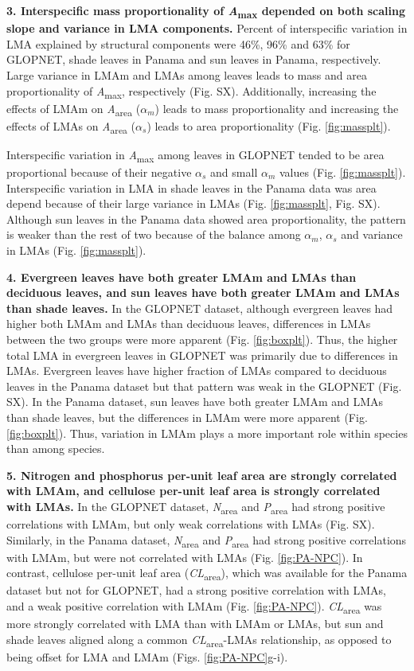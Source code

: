 \documentclass[
  12pt,
]{article}
\begin{document}
\textbf{3. Interspecific mass proportionality of \emph{A}\textsubscript{max} depended on both scaling slope and variance in LMA components.}
Percent of interspecific variation in LMA explained by structural components were 46\%, 96\% and 63\% for GLOPNET, shade leaves in Panama and sun leaves in Panama, respectively.
Large variance in LMAm and LMAs among leaves leads to mass and area proportionality of \emph{A}\textsubscript{max}, respectively (Fig. SX). Additionally, increasing the effects of LMAm on \emph{A}\textsubscript{area} (\(\alpha_m\)) leads to mass proportionality and increasing the effects of LMAs on \emph{A}\textsubscript{area} (\(\alpha_s\)) leads to area proportionality (Fig. \ref{fig:massplt}).

Interspecific variation in \emph{A}\textsubscript{max} among leaves in GLOPNET tended to be area proportional because of their negative \(\alpha_s\) and small \(\alpha_m\) values (Fig. \ref{fig:massplt}).
Interspecific variation in LMA in shade leaves in the Panama data was area depend because of their large variance in LMAs (Fig. \ref{fig:massplt}, Fig. SX).
Although sun leaves in the Panama data showed area proportionality, the
pattern is weaker than the rest of two because of the balance among \(\alpha_m\), \(\alpha_s\) and variance in LMAs (Fig. \ref{fig:massplt}).

\textbf{4. Evergreen leaves have both greater LMAm and LMAs than deciduous leaves, and sun leaves have both greater LMAm and LMAs than shade leaves.}
In the GLOPNET dataset, although evergreen leaves had higher both LMAm and LMAs than deciduous leaves, differences in LMAs between the two groups were more apparent (Fig. \ref{fig:boxplt}).
Thus, the higher total LMA in evergreen leaves in GLOPNET was primarily due to differences in LMAs.
Evergreen leaves have higher fraction of LMAs compared to deciduous leaves in the Panama dataset but that pattern was weak in the GLOPNET (Fig. SX).
In the Panama dataset, sun leaves have both greater LMAm and LMAs than shade leaves, but the differences in LMAm were more apparent (Fig. \ref{fig:boxplt}).
Thus, variation in LMAm plays a more important role within species than among species.

\textbf{5. Nitrogen and phosphorus per-unit leaf area are strongly correlated with LMAm, and cellulose per-unit leaf area is strongly correlated with LMAs.}
In the GLOPNET dataset, \emph{N}\textsubscript{area} and \emph{P}\textsubscript{area} had strong positive correlations with LMAm, but only weak correlations with LMAs (Fig. SX).
Similarly, in the Panama dataset, \emph{N}\textsubscript{area} and \emph{P}\textsubscript{area} had strong positive correlations with LMAm, but were not correlated with LMAs (Fig. \ref{fig:PA-NPC}).
In contrast, cellulose per-unit leaf area (\emph{CL}\textsubscript{area}), which was available for the Panama dataset but not for GLOPNET, had a strong positive correlation with LMAs, and a weak positive correlation with LMAm (Fig. \ref{fig:PA-NPC}).
\emph{CL}\textsubscript{area} was more strongly correlated with LMA than with LMAm or LMAs, but sun and shade leaves aligned along a common \emph{CL}\textsubscript{area}-LMAs relationship, as opposed to being offset for LMA and LMAm (Figs. \ref{fig:PA-NPC}g-i).
\end{document}
